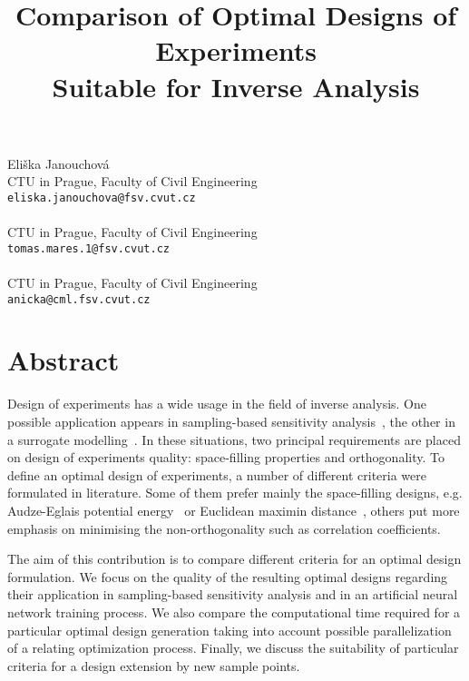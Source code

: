 \title{Comparison of Optimal Designs of Experiments \\ Suitable for Inverse Analysis}
 \author{} \institute{}
\maketitle
\begin{center}
{\large Eli\v{s}ka Janouchov\'a}\\
CTU in Prague, Faculty of Civil Engineering\\
{\tt eliska.janouchova@fsv.cvut.cz}
\\ \\
CTU in Prague, Faculty of Civil Engineering\\
{\tt tomas.mares.1@fsv.cvut.cz}
\\ \\
CTU in Prague, Faculty of Civil Engineering\\
{\tt anicka@cml.fsv.cvut.cz}

\end{center}

\section*{Abstract}

Design of experiments has a wide usage in the field of inverse
analysis. One possible application appears in sampling-based
sensitivity analysis~\cite{Helton:2006:RESS2}, the other in a
surrogate modelling~\cite{Simpson:2001:EC}. In these situations, two
principal requirements are placed on design of experiments quality:
space-filling properties and orthogonality. To define an optimal
design of experiments, a number of different criteria were formulated
in literature. Some of them prefer mainly the space-filling designs,
e.g.  Audze-Eglais potential energy~\cite{Audze:1977} or Euclidean
maximin distance~\cite{Johnson:1990:JSPI}, others put more emphasis on
minimising the non-orthogonality such as correlation coefficients.

The aim of this contribution is to compare different criteria for an
optimal design formulation. We focus on the quality of the resulting
optimal designs regarding their application in sampling-based
sensitivity analysis and in an artificial neural network training
process. We also compare the computational time required for a
particular optimal design generation taking into account possible
parallelization of a relating optimization process. Finally, we 
discuss the suitability of particular criteria for a design extension
by new sample points.



